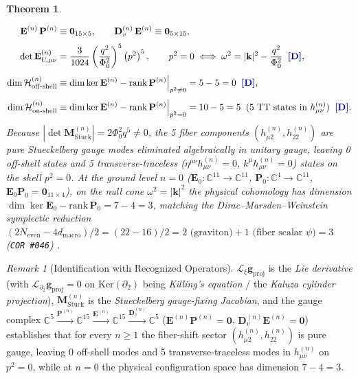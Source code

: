 \documentclass[11pt,a4paper]{article}
\newcommand{\catD}{\text{\textbf{\textcolor{blue!75!black}{[D]}}}}
\theoremstyle{definition}
\theoremstyle{plain}
\newtheorem{theorem}[axiom]{Theorem}
\theoremstyle{remark}
\newtheorem{remark}[axiom]{Remark}
\begin{document}
\begin{theorem}
\begin{enumerate}[label=(\roman*)]
  \begin{align}
  \mathbf{E}^{(n)}\,\mathbf{P}^{(n)} &\equiv \mathbf{0}_{15\times 5}, \qquad
  \mathbf{D}_v^{(n)}\,\mathbf{E}^{(n)} \equiv \mathbf{0}_{5\times 15}, \nonumber \\[3pt]
  \det\mathbf{E}_{U,\mu\nu}^{(n)} &= \frac{3}{1024}\left(\frac{q^2}{\Phi_0^2}\right)^5\left(p^2\right)^5, \qquad
  p^2 = 0 \iff \omega^2 = |\mathbf{k}|^2 - \frac{q^2}{\Phi_0^2} \;\;\catD, \nonumber \\[4pt]
  \dim\mathcal{H}_{\mathrm{off\text{-}shell}}^{(n)} &\equiv \dim\ker\mathbf{E}^{(n)} - \mathrm{rank}\,\mathbf{P}^{(n)}\Big|_{p^2 \neq 0} = 5 - 5 = 0 \;\;\catD, \nonumber \\[3pt]
  \dim\mathcal{H}_{\mathrm{on\text{-}shell}}^{(n)} &\equiv \dim\ker\mathbf{E}^{(n)} - \mathrm{rank}\,\mathbf{P}^{(n)}\Big|_{p^2 = 0} = 10 - 5 = 5 \;\;\textnormal{(5 TT states in $h_{\mu\nu}^{(n)}$)} \;\;\catD. \label{eq:c2_q_nilpotent_matrix}
  \end{align}
  Because $|\det\mathbf{M}_{\mathrm{St\ddot{u}ck}}^{(n)}| = 2\Phi_0^2 q^5 \neq 0$, the 5 fiber components $(h_{\mu 2}^{(n)}, h_{22}^{(n)})$ are pure Stueckelberg gauge modes eliminated algebraically in unitary gauge, leaving 0 off-shell states and 5 transverse-traceless ($\eta^{\mu\nu}h_{\mu\nu}^{(n)} = 0$, $k^\mu h_{\mu\nu}^{(n)} = 0$) states on the shell $p^2 = 0$. At the ground level $n = 0$ ($\mathbf{E}_0: \mathbb{C}^{11} \to \mathbb{C}^{11}$, $\mathbf{P}_0: \mathbb{C}^4 \to \mathbb{C}^{11}$, $\mathbf{E}_0\mathbf{P}_0 = \mathbf{0}_{11\times 4}$), on the null cone $\omega^2 = |\mathbf{k}|^2$ the physical cohomology has dimension $\dim\ker\mathbf{E}_0 - \mathrm{rank}\,\mathbf{P}_0 = 7 - 4 = 3$, matching the Dirac--Marsden--Weinstein symplectic reduction $(2 N_{\mathrm{even}} - 4 d_{\mathrm{macro}})/2 = (22 - 16)/2 = 2\text{ (graviton)} + 1\text{ (fiber scalar } \psi) = 3$ (\texttt{COR~\#046}) \catD.
\end{enumerate}
\end{theorem}

\begin{remark}[Identification with Recognized Operators]\label{rem:c2_step1_recognition}
$\mathcal{L}_\xi\mathbf{g}_{\mathrm{proj}}$ is the \emph{Lie derivative} (with $\mathcal{L}_{\partial_2}\mathbf{g}_{\mathrm{proj}} = 0$ on $\mathrm{Ker}(\partial_2)$ being \emph{Killing's equation} / the \emph{Kaluza cylinder projection}), $\mathbf{M}_{\mathrm{St\ddot{u}ck}}^{(n)}$ is the \emph{Stueckelberg gauge-fixing Jacobian}, and the gauge complex $\mathbb{C}^5 \xrightarrow{\mathbf{P}^{(n)}} \mathbb{C}^{15} \xrightarrow{\mathbf{E}^{(n)}} \mathbb{C}^{15} \xrightarrow{\mathbf{D}_v^{(n)}} \mathbb{C}^5$ ($\mathbf{E}^{(n)}\mathbf{P}^{(n)} = \mathbf{0}$, $\mathbf{D}_v^{(n)}\mathbf{E}^{(n)} = \mathbf{0}$) establishes that for every $n \ge 1$ the fiber-shift sector $(h_{\mu 2}^{(n)}, h_{22}^{(n)})$ is pure gauge, leaving 0 off-shell modes and 5 transverse-traceless modes in $h_{\mu\nu}^{(n)}$ on $p^2 = 0$, while at $n = 0$ the physical configuration space has dimension $7 - 4 = 3$.
\end{remark}
\end{document}
